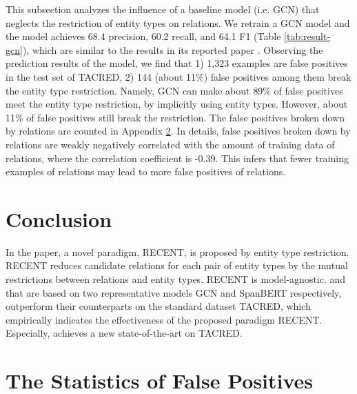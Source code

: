 \documentclass[11pt,a4paper]{article}
\begin{document}
This subsection analyzes the influence of a baseline model (i.e. GCN) that neglects the restriction of entity types on relations. 
We retrain a GCN model and the model achieves 68.4 precision, 60.2 recall, and 64.1 F1 (Table \ref{tab:result-gcn}), 
which are similar to the results in its reported paper \cite{zhang-etal-2018-graph}. 
Observing the prediction results of the model, we find that 1) 1,323 examples are false positives in the test set of TACRED, 
2) 144 (about 11\%) false positives among them break the entity type restriction. 
Namely, GCN can make about 89\% of false positives meet the entity type restriction, by implicitly using entity types. 
However, about 11\% of false positives still break the restriction. 
The false positives broken down by relations are counted in Appendix \ref{apx:stat-fp}.
In details, false positives  broken down by relations are weakly negatively correlated with the amount of training data of relations, where the correlation coefficient is -0.39. 
This infers that fewer training examples of relations may lead to more false positives of relations.


\section{Conclusion}

In the paper, a novel paradigm, RECENT, is proposed by entity type restriction.
RECENT reduces  candidate relations for each pair of entity types by 
the mutual restrictions between relations and entity types.
RECENT is model-agnostic. 
 and  
that are based on two representative models GCN and SpanBERT respectively,
outperform their counterparts on the standard dataset TACRED, 
which empirically indicates the effectiveness of the proposed paradigm RECENT.
Especially,  achieves a new state-of-the-art on TACRED.










\appendix 
\section{The Statistics of False Positives}
\label{apx:stat-fp} 
\end{document}

